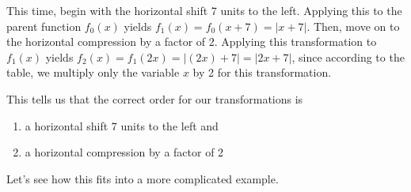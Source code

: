 \documentclass[handout, noauthor, nooutcomes]{ximera}
\begin{document}
\begin{example}
\begin{explanation}
This time, begin with the horizontal shift 7 units to the left. Applying this to the parent function $f_0(x)$ yields $f_1(x) = f_0(x + 7) = |x + 7|$. Then, move on to the horizontal compression by a factor of 2. Applying this transformation to $f_1(x)$ yields $f_2(x) = f_1(2x) = |(2x) + 7| = |2x + 7|$, since according to the table, we multiply only the variable $x$ by 2 for this transformation. 

This tells us that the correct order for our transformations is 
\begin{enumerate}
\item a horizontal shift 7 units to the left and
\item a horizontal compression by a factor of 2
\end{enumerate}
\end{explanation}
\end{example}

Let's see how this fits into a more complicated example.
\end{document}
